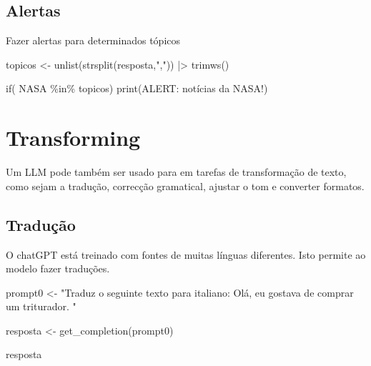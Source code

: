 \documentclass[
  letterpaper,
  paper=6in:9in,
  pagesize=pdftex,
  headinclude=on,
  footinclude=on,
  12pt]{scrbook}
\newenvironment{Shaded}{\begin{snugshade}}{\end{snugshade}}
\newcommand{\ControlFlowTok}[1]{\textcolor[rgb]{0.00,0.23,0.31}{#1}}
\newcommand{\FunctionTok}[1]{\textcolor[rgb]{0.28,0.35,0.67}{#1}}
\newcommand{\NormalTok}[1]{\textcolor[rgb]{0.00,0.23,0.31}{#1}}
\newcommand{\OtherTok}[1]{\textcolor[rgb]{0.00,0.23,0.31}{#1}}
\newcommand{\SpecialCharTok}[1]{\textcolor[rgb]{0.37,0.37,0.37}{#1}}
\newcommand{\StringTok}[1]{\textcolor[rgb]{0.13,0.47,0.30}{#1}}
\begin{document}
\hypertarget{alertas}{%
\section{Alertas}\label{alertas}}

Fazer alertas para determinados tópicos

\begin{Shaded}
\begin{Highlighting}[]
\NormalTok{topicos }\OtherTok{\textless{}{-}} \FunctionTok{unlist}\NormalTok{(}\FunctionTok{strsplit}\NormalTok{(resposta,}\StringTok{","}\NormalTok{)) }\SpecialCharTok{|\textgreater{}} \FunctionTok{trimws}\NormalTok{()}

\ControlFlowTok{if}\NormalTok{( }\StringTok{\textquotesingle{}NASA\textquotesingle{}} \SpecialCharTok{\%in\%}\NormalTok{ topicos) }\FunctionTok{print}\NormalTok{(}\StringTok{\textquotesingle{}ALERT: notícias da NASA!\textquotesingle{}}\NormalTok{)}
\end{Highlighting}
\end{Shaded}


\hypertarget{transforming}{%
\chapter{Transforming}\label{transforming}}

Um LLM pode também ser usado para em tarefas de transformação de texto,
como sejam a tradução, correcção gramatical, ajustar o tom e converter
formatos.

\hypertarget{traduuxe7uxe3o}{%
\section{Tradução}\label{traduuxe7uxe3o}}

O chatGPT está treinado com fontes de muitas línguas diferentes. Isto
permite ao modelo fazer traduções.

\begin{Shaded}
\begin{Highlighting}[]
\NormalTok{prompt0 }\OtherTok{\textless{}{-}} \StringTok{"Traduz o seguinte texto para italiano: \textquotesingle{}\textquotesingle{}\textquotesingle{} Olá, eu gostava de comprar um triturador. \textquotesingle{}\textquotesingle{}\textquotesingle{}"}

\NormalTok{resposta }\OtherTok{\textless{}{-}} \FunctionTok{get\_completion}\NormalTok{(prompt0)}

\NormalTok{resposta}
\end{Highlighting}
\end{Shaded}
\end{document}
